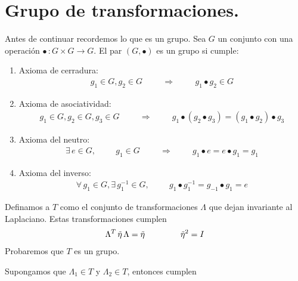 \section{Grupo de transformaciones.}
Antes de continuar recordemos lo que es un grupo. Sea $G$ un conjunto con una operación $\bullet \, : G \times G \rightarrow G$. El par $(G, \bullet)$ es un grupo si cumple:
\begin{enumerate}[label=\arabic*)]
\item Axioma de cerradura:
\begin{align}
g_{1} \in G, g_{2} \in G \hspace{1cm} \Rightarrow \hspace{1cm} g_{1} \bullet g_{2} \in G
\label{eq:ecuacion_10_028}
\end{align}
\item Axioma de asociatividad:
\begin{align}
g_{1} \in G, g_{2} \in G, g_{3} \in G \hspace{1cm} \Rightarrow \hspace{1cm} g_{1} \bullet (g_{2} \bullet g_{3}) = (g_{1} \bullet g_{2}) \bullet g_{3}
\label{eq:ecuacion_10_029}
\end{align}
\item Axioma del neutro:
\begin{align}
\exists \, e \in G, \hspace{1cm} g_{1} \in G \hspace{1cm} \Rightarrow \hspace{1cm} g_{1} \bullet e = e \bullet g_{1} = g_{1}
\label{eq:ecuacion_10_030}
\end{align}
\item Axioma del inverso:
\begin{align}
\forall \, g_{1} \in G, \exists \, g_{1}^{-1} \in G, \hspace{1cm} g_{1} \bullet g_{1}^{-1} = g_{-1} \bullet g_{1} = e
\label{eq:ecuacion_10_031}
\end{align}
\end{enumerate}
Definamos a $T$ como el conjunto de transformaciones $\Lambda$ que dejan invariante al Laplaciano. Estas transformaciones cumplen
\begin{align}
\Lambda^{T} \, \tilde{\eta} \, \Lambda = \tilde{\eta} \hspace{1.5cm} \tilde{\eta}^{2} = I
\label{eq:ecuacion_10_032}
\end{align}
Probaremos que $T$ es un grupo.
\par
Supongamos que $\Lambda_{1} \in T$ y $\Lambda_{2} \in T$, entonces cumplen
